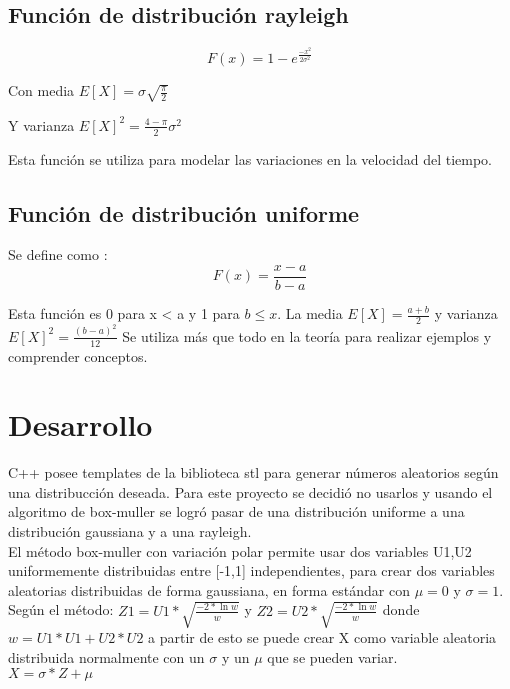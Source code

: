 \documentclass[letterpaper]{article}
\begin{document}
\subsection{Función de distribución rayleigh}

\begin{equation}
F(x) = 1 - e^\frac{-x^2}{2\sigma^2}
\end{equation}

Con media $E[X]= \sigma\sqrt{\frac{\pi}{2}}$

Y varianza $E[X]^2 = \frac{4-\pi}{2}\sigma^2$

Esta función se utiliza para modelar las variaciones en la velocidad del tiempo. \cite{H.Crammer}

\subsection{Función de distribución uniforme}
Se define como :
\begin{equation}
F(x) = \frac{x-a}{b-a}
\end{equation}

Esta función es 0 para x < a y 1 para $b\leq x$. La media $E[X]=\frac{a+b}{2}$ y varianza $E[X]^2=\frac{(b-a)^2}{12}$ 
Se utiliza más que todo en la teoría para realizar ejemplos y comprender conceptos.\cite{Peyton}


\section{Desarrollo}

C++ posee templates de la biblioteca stl para generar números aleatorios según una distribucción deseada. Para este proyecto se decidió no usarlos y usando el algoritmo de box-muller se logró pasar de una distribución uniforme a una distribución gaussiana y a una rayleigh.\\

El método box-muller con variación polar permite usar dos variables U1,U2 uniformemente distribuidas entre [-1,1] independientes, para crear dos variables aleatorias distribuidas de forma gaussiana, en forma estándar con $\mu=0$ y $\sigma=1$.\cite{Marsaglia}\\

Según el método: $Z1 = U1 * \sqrt{\frac{-2 * \ln w}{w}}$ y $Z2 = U2 * \sqrt{\frac{-2 * \ln w}{w}}$ donde $w = U1*U1 +U2*U2$ a partir de esto se puede crear X como variable aleatoria distribuida normalmente con un $\sigma$ y un $\mu$ que se pueden variar.\cite{Marsaglia}\\
$X = \sigma * Z + \mu$
\end{document}
